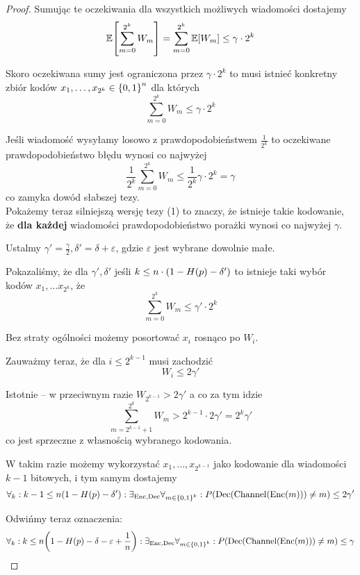 \begin{proof}
    Sumując te oczekiwania dla wszystkich możliwych wiadomości dostajemy
    \[
       \expected{\sum_{m=0}^{2^k} W_m} = \sum_{m=0}^{2^k} \expected{W_m} \leq \gamma \cdot 2^k
    \]
    
    Skoro oczekiwana sumy jest ograniczona przez \( \gamma \cdot 2^k \)
    to musi istnieć konkretny zbiór kodów \( x_1, \dots, x_{2^k} \in \set{0, 1}^n \) dla których
    \[
        \sum_{m=0}^{2^k} W_m \leq \gamma \cdot 2^k
    \]
    
    Jeśli wiadomość wysyłamy losowo z prawdopodobieństwem \( \frac{1}{2^k} \) to oczekiwane prawdopodobieństwo błędu wynosi co najwyżej
    \[
        \frac{1}{2^k} \sum_{m=0}^{2^k} W_m \leq \frac{1}{2^k} \gamma \cdot 2^k = \gamma
    \]
    co zamyka dowód słabszej tezy. \\

    Pokażemy teraz silniejszą wersję tezy (1) to znaczy, że istnieje takie kodowanie, 
    że \textbf{dla każdej} wiadomości prawdopodobieństwo porażki wynosi co najwyżej \( \gamma \).
    
    Ustalmy \( \gamma' = \frac{\gamma}{2}, \delta' = \delta + \varepsilon \), gdzie \( \varepsilon \)
    jest wybrane dowolnie małe.
    
    Pokazaliśmy, że dla \( \gamma', \delta' \) jeśli \( k \leq n \cdot \left(1 - H(p) - \delta'\right) \)
    to istnieje taki wybór kodów \( x_1, \dots x_{2^k} \), że
    \[
        \sum_{m=0}^{2^k} W_m \leq \gamma' \cdot 2^k
    \]
    
    Bez straty ogólności możemy posortować \( x_i \) rosnąco po \( W_i \).
    
    Zauważmy teraz, że dla \( i \leq 2^{k-1} \) musi zachodzić
    \[
        W_i \leq 2\gamma'
    \]
    
    Istotnie -- w przeciwnym razie \( W_{2^{k-1}} > 2\gamma' \) a co za tym idzie
    \[
        \sum_{m=2^{k-1}+1}^{2^k} W_m > 2^{k-1} \cdot 2\gamma' = 2^k \gamma'
    \]
    co jest sprzeczne z własnością wybranego kodowania.
    
    W takim razie możemy wykorzystać \( x_1, \dots, x_{2^{k-1}} \) jako kodowanie dla wiadomości \( k - 1 \) bitowych, i tym samym dostajemy
    \begin{multline*}
        \forall_k :  k - 1 \leq n \pars{1 - H(p) - \delta'}:
        \exists_{\Enc, \Dec} \forall_{m \in \set{0, 1}^k} : 
            P\pars{\Dec(\Channel(\Enc(m))) \neq m} \leq 2\gamma'
    \end{multline*}

    Odwińmy teraz oznaczenia:
    \begin{multline*}
        \forall_k :  k \leq n \pars{1 - H(p) - \delta - \varepsilon + \frac{1}{n}}:
        \exists_{\Enc, \Dec} \forall_{m \in \set{0, 1}^k} : 
            P\pars{\Dec(\Channel(\Enc(m))) \neq m} \leq \gamma
    \end{multline*}
    

\end{proof}
